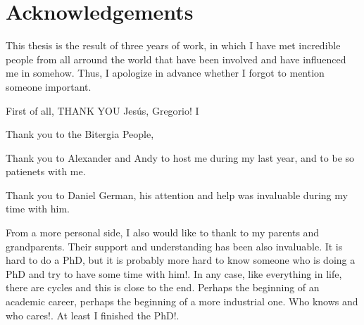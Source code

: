 \documentclass[a4paper, 12pt]{book}
\begin{document}

\chapter*{Acknowledgements}

This thesis is the result of three years of work, in which I have met incredible people from all arround the world that have been involved and have influenced me in somehow. Thus, I apologize in advance whether I forgot to mention someone important.

First of all, THANK YOU Jes\'us, Gregorio! I

Thank you to the Bitergia People,

Thank you to Alexander and Andy to host me during my last year, and to be so patienets with me.

Thank you to Daniel German, his attention and help was invaluable during my time with him.

From a more personal side, I also would like to thank to my parents and grandparents. Their support and understanding has been also invaluable. It is hard to do a PhD, but it is probably more hard to know someone who is doing a PhD and try to have some time with him!.
In any case, like everything in life, there are cycles and this is close to the end. Perhaps the beginning of an academic career, perhaps the beginning of a more industrial one. Who knows and who cares!. At least I finished the PhD!.
\end{document}
